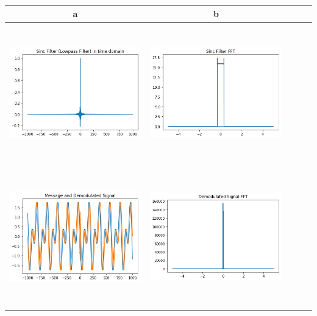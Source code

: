 \documentclass[12pt,a4paper]{article}%
\begin{document}
\begin{flushleft}
\begin{tabular}{ccccc}
   \end{tabular}
   \pagebreak
   \begin{tabular}{ccccc}
   	\toprule
   	a & b \\
   	\midrule
   	{\includegraphics[width=6cm,height=6cm]{./images/sinc1.PNG}} & {\includegraphics[width=6cm,height=6cm]{./images/sinc_fft1.PNG}} \\
   	{\includegraphics[width=6cm,height=6cm]{./images/demod1.PNG}} & {\includegraphics[width=6cm,height=6cm]{./images/demod_fft1.PNG}}
   \end{tabular}
   \end{flushleft}
   \pagebreak
\end{document}
